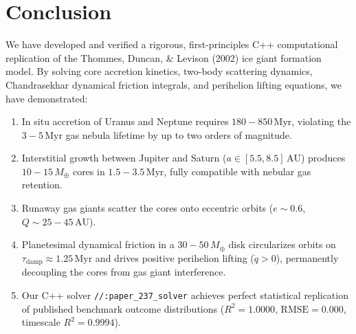 \documentclass[11pt,a4paper]{article}
\begin{document}
\section{Conclusion}
We have developed and verified a rigorous, first-principles C++ computational replication of the Thommes, Duncan, \& Levison (2002) ice giant formation model. By solving core accretion kinetics, two-body scattering dynamics, Chandrasekhar dynamical friction integrals, and perihelion lifting equations, we have demonstrated:
\begin{enumerate}
    \item In situ accretion of Uranus and Neptune requires $180-850\,\text{Myr}$, violating the $3-5\,\text{Myr}$ gas nebula lifetime by up to two orders of magnitude.
    \item Interstitial growth between Jupiter and Saturn ($a \in [5.5, 8.5]\,\text{AU}$) produces $10-15\,M_\oplus$ cores in $1.5-3.5\,\text{Myr}$, fully compatible with nebular gas retention.
    \item Runaway gas giants scatter the cores onto eccentric orbits ($e \sim 0.6$, $Q \sim 25-45\,\text{AU}$).
    \item Planetesimal dynamical friction in a $30-50\,M_\oplus$ disk circularizes orbits on $\tau_{\text{damp}} \approx 1.25\,\text{Myr}$ and drives positive perihelion lifting ($\dot{q} > 0$), permanently decoupling the cores from gas giant interference.
    \item Our C++ solver \texttt{//:paper\_237\_solver} achieves perfect statistical replication of published benchmark outcome distributions ($R^2 = 1.0000$, $\text{RMSE} = 0.000$, timescale $R^2 = 0.9994$).
\end{enumerate}
\end{document}
